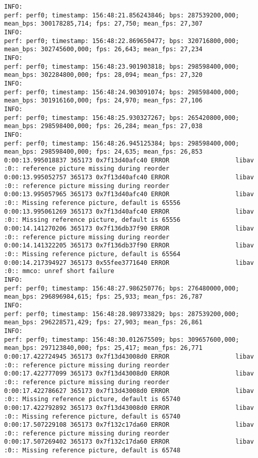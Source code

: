 \documentclass[12pt,oneside]{book}
\begin{document}
\begin{lstlisting}
INFO:
perf: perf0; timestamp: 156:48:21.856243846; bps: 287539200,000; mean_bps: 300178285,714; fps: 27,750; mean_fps: 27,307
INFO:
perf: perf0; timestamp: 156:48:22.869650477; bps: 320716800,000; mean_bps: 302745600,000; fps: 26,643; mean_fps: 27,234
INFO:
perf: perf0; timestamp: 156:48:23.901903818; bps: 298598400,000; mean_bps: 302284800,000; fps: 28,094; mean_fps: 27,320
INFO:
perf: perf0; timestamp: 156:48:24.903091074; bps: 298598400,000; mean_bps: 301916160,000; fps: 24,970; mean_fps: 27,106
INFO:
perf: perf0; timestamp: 156:48:25.930327267; bps: 265420800,000; mean_bps: 298598400,000; fps: 26,284; mean_fps: 27,038
INFO:
perf: perf0; timestamp: 156:48:26.945125384; bps: 298598400,000; mean_bps: 298598400,000; fps: 24,635; mean_fps: 26,853
0:00:13.995018837 365173 0x7f13d40afc40 ERROR                  libav :0:: reference picture missing during reorder
0:00:13.995052757 365173 0x7f13d40afc40 ERROR                  libav :0:: reference picture missing during reorder
0:00:13.995057965 365173 0x7f13d40afc40 ERROR                  libav :0:: Missing reference picture, default is 65556
0:00:13.995061269 365173 0x7f13d40afc40 ERROR                  libav :0:: Missing reference picture, default is 65556
0:00:14.141270206 365173 0x7f136db37f90 ERROR                  libav :0:: reference picture missing during reorder
0:00:14.141322205 365173 0x7f136db37f90 ERROR                  libav :0:: Missing reference picture, default is 65564
0:00:14.217394927 365173 0x55fee3771640 ERROR                  libav :0:: mmco: unref short failure
INFO:
perf: perf0; timestamp: 156:48:27.986250776; bps: 276480000,000; mean_bps: 296896984,615; fps: 25,933; mean_fps: 26,787
INFO:
perf: perf0; timestamp: 156:48:28.989733829; bps: 287539200,000; mean_bps: 296228571,429; fps: 27,903; mean_fps: 26,861
INFO:
perf: perf0; timestamp: 156:48:30.012675509; bps: 309657600,000; mean_bps: 297123840,000; fps: 25,417; mean_fps: 26,771
0:00:17.422724945 365173 0x7f13d43008d0 ERROR                  libav :0:: reference picture missing during reorder
0:00:17.422777099 365173 0x7f13d43008d0 ERROR                  libav :0:: reference picture missing during reorder
0:00:17.422786627 365173 0x7f13d43008d0 ERROR                  libav :0:: Missing reference picture, default is 65740
0:00:17.422792892 365173 0x7f13d43008d0 ERROR                  libav :0:: Missing reference picture, default is 65740
0:00:17.507229108 365173 0x7f132c17da60 ERROR                  libav :0:: reference picture missing during reorder
0:00:17.507269402 365173 0x7f132c17da60 ERROR                  libav :0:: Missing reference picture, default is 65748

\end{lstlisting}
\end{document}
